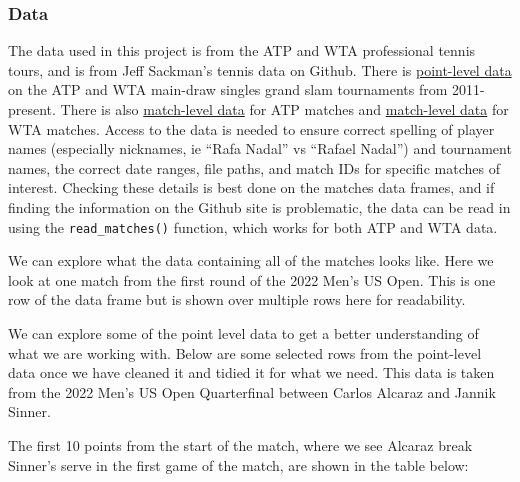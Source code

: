 \documentclass[
  letterpaper,
  DIV=11,
  numbers=noendperiod]{scrartcl}
\begin{document}
\subsubsection{Data}\label{sec-data}

The data used in this project is from the ATP and WTA professional
tennis tours, and is from Jeff Sackman's tennis data on Github. There is
\href{https://github.com/JeffSackmann/tennis_slam_pointbypoint}{point-level
data} on the ATP and WTA main-draw singles grand slam tournaments from
2011-present. There is also
\href{https://github.com/JeffSackmann/tennis_atp}{match-level data} for
ATP matches and
\href{https://github.com/JeffSackmann/tennis_wta}{match-level data} for
WTA matches. Access to the data is needed to ensure correct spelling of
player names (especially nicknames, ie ``Rafa Nadal'' vs ``Rafael
Nadal'') and tournament names, the correct date ranges, file paths, and
match IDs for specific matches of interest. Checking these details is
best done on the matches data frames, and if finding the information on
the Github site is problematic, the data can be read in using the
\texttt{read\_matches()} function, which works for both ATP and WTA
data.

We can explore what the data containing all of the matches looks like.
Here we look at one match from the first round of the 2022 Men's US
Open. This is one row of the data frame but is shown over multiple rows
here for readability.

\linespread{0.9}

\linespread{2}

We can explore some of the point level data to get a better
understanding of what we are working with. Below are some selected rows
from the point-level data once we have cleaned it and tidied it for what
we need. This data is taken from the 2022 Men's US Open Quarterfinal
between Carlos Alcaraz and Jannik Sinner.

\linespread{0.9}

\linespread{2}

The first 10 points from the start of the match, where we see Alcaraz
break Sinner's serve in the first game of the match, are shown in the
table below:

\linespread{0.9}

\begingroup\fontsize{11}{13}\selectfont
\end{document}
